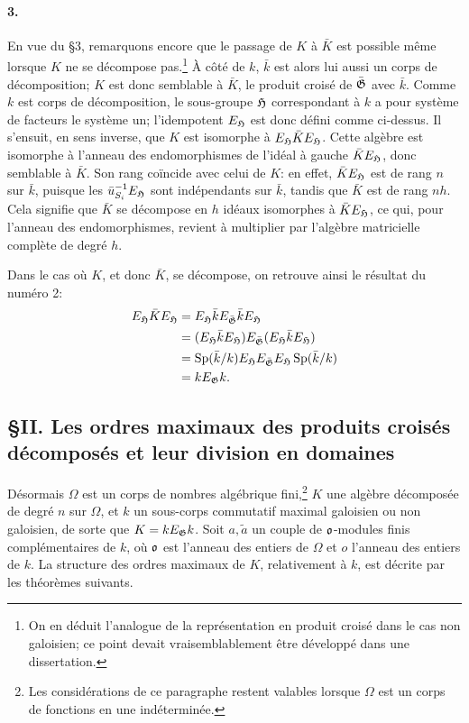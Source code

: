 \paragraph{3.}
En vue du \S{}3, remarquons encore que le passage de \(K\) à \(\bar K\) est possible même lorsque \(K\) ne se décompose pas.\footnote{On en déduit l'analogue de la représentation en produit croisé dans le cas non galoisien; ce point devait vraisemblablement être développé dans une dissertation.} À côté de \(k\), \(\bar k\) est alors lui aussi un corps de décomposition; \(K\) est donc semblable à \(\bar K\), le produit croisé de \(\bar{\mathfrak G}\) avec \(\bar k\). Comme \(k\) est corps de décomposition, le sous-groupe \(\mathfrak H\) correspondant à \(k\) a pour système de facteurs le système un; l'idempotent \(E_\mathfrak H\) est donc défini comme ci-dessus. Il s'ensuit, en sens inverse, que \(K\) est isomorphe à \(E_\mathfrak H\bar K E_\mathfrak H\). Cette algèbre est isomorphe à l'anneau des endomorphismes de l'idéal à gauche \(\bar K E_\mathfrak H\), donc semblable à \(\bar K\). Son rang coïncide avec celui de \(K\): en effet, \(\bar K E_\mathfrak H\) est de rang \(n\) sur \(\bar k\), puisque les \(\bar u_{S_i}^{-1}E_\mathfrak H\) sont indépendants sur \(\bar k\), tandis que \(\bar K\) est de rang \(nh\). Cela signifie que \(\bar K\) se décompose en \(h\) idéaux isomorphes à \(\bar K E_\mathfrak H\), ce qui, pour l'anneau des endomorphismes, revient à multiplier par l'algèbre matricielle complète de degré \(h\).

Dans le cas où \(K\), et donc \(\bar K\), se décompose, on retrouve ainsi le résultat du numéro 2:
\[
\begin{aligned}
E_\mathfrak H\bar K E_\mathfrak H
 &=E_\mathfrak H\bar kE_{\bar{\mathfrak G}}\bar kE_\mathfrak H\\
 &=(E_\mathfrak H\bar kE_\mathfrak H)E_{\bar{\mathfrak G}}(E_\mathfrak H\bar kE_\mathfrak H)\\
 &=\operatorname{Sp}(\bar k/k)E_\mathfrak H E_{\bar{\mathfrak G}}E_\mathfrak H\operatorname{Sp}(\bar k/k)\\
 &=kE_\mathfrak G k .
\end{aligned}
\]

\subsection*{\S{}II. Les ordres maximaux des produits croisés décomposés et leur division en domaines}

Désormais \(\Omega\) est un corps de nombres algébrique fini,\footnote{Les considérations de ce paragraphe restent valables lorsque \(\Omega\) est un corps de fonctions en une indéterminée.} \(K\) une algèbre décomposée de degré \(n\) sur \(\Omega\), et \(k\) un sous-corps commutatif maximal galoisien ou non galoisien, de sorte que \(K=kE_\mathfrak G k\). Soit \(a,\widetilde a\) un couple de \(\mathfrak o\)-modules finis complémentaires de \(k\), où \(\mathfrak o\) est l'anneau des entiers de \(\Omega\) et \(o\) l'anneau des entiers de \(k\). La structure des ordres maximaux de \(K\), relativement à \(k\), est décrite par les théorèmes suivants.

